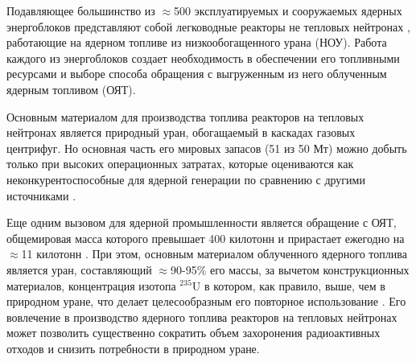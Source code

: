 {\actuality}

Подавляющее большинство из $\approx$500 эксплуатируемых и сооружаемых ядерных энергоблоков представляют собой легководные реакторы не тепловых нейтронах \cite{PRISHome}, работающие на ядерном топливе из низкообогащенного урана (НОУ). Работа каждого из энергоблоков создает необходимость в обеспечении его топливными ресурсами и выборе способа обращения с выгруженным из него облученным ядерным топливом (ОЯТ).

Основным материалом для производства топлива реакторов на тепловых нейтронах является природный уран, обогащаемый в каскадах газовых центрифуг. Но основная часть его мировых запасов (51 из 50 Мт) можно добыть только при высоких операционных затратах, которые оцениваются как неконкурентоспособные для ядерной генерации по сравнению с другими источниками \cite{/content/publication/d82388ab-en,WorldDistributionUranium2018,hartardCompetitionConflictsResource2015}. 

Еще одним вызовом для ядерной промышленности является обращение с ОЯТ, общемировая масса которого превышает 400 килотонн и прирастает ежегодно на $\approx$11 килотонн \cite{kaygorodcevProblemyPerspektivyRazvitiya2021,UseReprocessedUranium2019}. При этом, основным материалом облученного ядерного топлива является уран, составляющий $\approx$90-95\% его массы, за вычетом конструкционных материалов, концентрация изотопа $^{235}$U в котором, как правило, выше, чем в природном уране, что делает целесообразным его повторное использование \cite{NikipelovNikipelovSudby}. Его вовлечение в производство ядерного топлива реакторов на тепловых нейтронах может позволить существенно сократить объем захоронения радиоактивных отходов и снизить потребности в природном уране.

